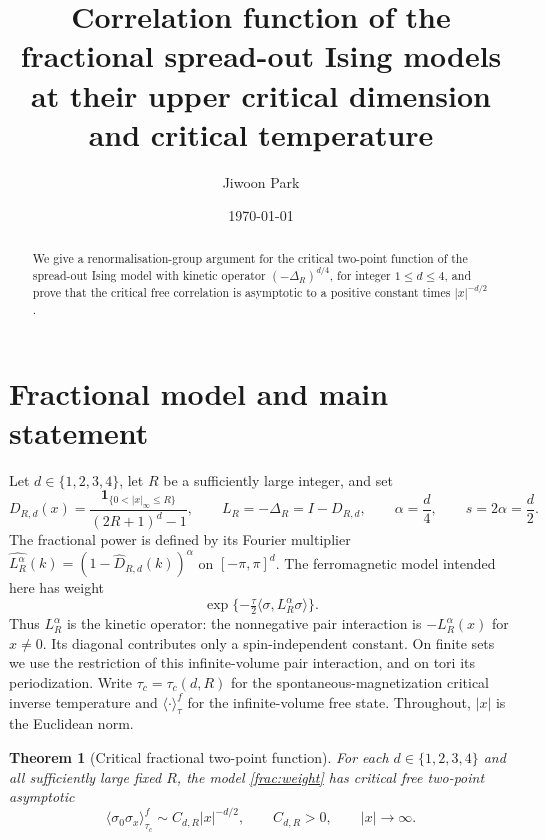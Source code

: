\documentclass[11pt]{article}
\title{Correlation function of the fractional spread-out Ising models at their upper critical dimension and critical temperature}
\author{Jiwoon Park}
\date{\today}
\newtheorem{theorem}{Theorem}
\begin{document}
\maketitle

\begin{abstract}
We give a renormalisation-group argument for the critical two-point
function of the spread-out Ising model with kinetic operator
\((-\Delta_R)^{d/4}\), for integer \(1\le d\le4\), 
and prove that the critical free correlation is
asymptotic to a positive constant times \(|x|^{-d/2}\).
\end{abstract}

\section{Fractional model and main statement}
Let \(d\in\{1,2,3,4\}\), let \(R\) be a sufficiently large integer, and set
\[
 D_{R,d}(x)=\frac{\boldsymbol1_{\{0<|x|_\infty\le R\}}}
                  {(2R+1)^d-1},\qquad
 L_R=-\Delta_R=I-D_{R,d},\qquad
 \alpha=\frac d4,\qquad s=2\alpha=\frac d2.
\]
The fractional power is defined by its Fourier multiplier
\(\widehat{L_R^\alpha}(k)=(1-\widehat D_{R,d}(k))^\alpha\)
on \([-\pi,\pi]^d\). The ferromagnetic model intended here has weight
\begin{equation}\label{frac:weight}
 \exp\{-\tfrac\tau2\langle\sigma,L_R^\alpha\sigma\rangle\}.
\end{equation}
Thus \(L_R^\alpha\) is the kinetic operator: the nonnegative pair
interaction is \(-L_R^\alpha(x)\) for \(x\ne0\). Its diagonal contributes
only a spin-independent constant. On finite sets we use the restriction
of this infinite-volume pair interaction, and on tori its periodization.
Write \(\tau_c=\tau_c(d,R)\) for the spontaneous-magnetization critical
inverse temperature and \(\langle\cdot\rangle^f_\tau\) for the
infinite-volume free state. Throughout, \(|x|\) is the Euclidean norm.

\begin{theorem}[Critical fractional two-point function]
\label{frac:main}
For each \(d\in\{1,2,3,4\}\) and all sufficiently large fixed \(R\),
the model \eqref{frac:weight} has critical free two-point asymptotic
\begin{equation}\label{frac:target}
 \langle\sigma_0\sigma_x\rangle^f_{\tau_c}
       \sim C_{d,R}|x|^{-d/2},\qquad C_{d,R}>0,
       \qquad |x|\longrightarrow\infty.
\end{equation}
\end{theorem}
\end{document}
